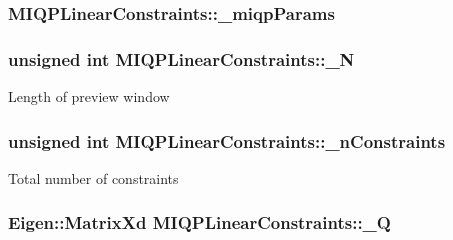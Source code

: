 \hypertarget{classMIQPLinearConstraints_a22f1b42e65d283a0d748333cc7119a7e}{
\subsubsection[{\-\_\-miqp\-Params}]{ {\bf \-M\-I\-Q\-P\-Linear\-Constraints\-::\-\_\-miqp\-Params}}}\label{classMIQPLinearConstraints_a22f1b42e65d283a0d748333cc7119a7e}
\hypertarget{classMIQPLinearConstraints_a1edaf84d613dde3f86fd9e78aa14a077}{
\subsubsection[{\-\_\-\-N}]{\setlength{\rightskip}{0pt plus 5cm}unsigned int {\bf \-M\-I\-Q\-P\-Linear\-Constraints\-::\-\_\-\-N}}}\label{classMIQPLinearConstraints_a1edaf84d613dde3f86fd9e78aa14a077}
\-Length of preview window \hypertarget{classMIQPLinearConstraints_a2726424eb890fe556ce503096b418d0f}{
\subsubsection[{\-\_\-n\-Constraints}]{\setlength{\rightskip}{0pt plus 5cm}unsigned int {\bf \-M\-I\-Q\-P\-Linear\-Constraints\-::\-\_\-n\-Constraints}}}\label{classMIQPLinearConstraints_a2726424eb890fe556ce503096b418d0f}
\-Total number of constraints \hypertarget{classMIQPLinearConstraints_afecaf6e02135bfba45045fab6cce3511}{
\subsubsection[{\-\_\-\-Q}]{\setlength{\rightskip}{0pt plus 5cm}\-Eigen\-::\-Matrix\-Xd {\bf \-M\-I\-Q\-P\-Linear\-Constraints\-::\-\_\-\-Q}}}\label{classMIQPLinearConstraints_afecaf6e02135bfba45045fab6cce3511}
